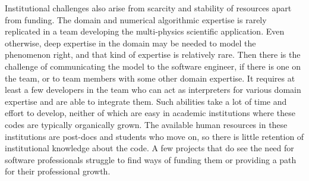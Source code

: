 Institutional challenges also arise from scarcity and stability of
resources apart from funding. The domain and numerical algorithmic
expertise is rarely replicated in a team developing the multi-physics
scientific application.  Even otherwise, deep expertise in the domain may be
needed to model the phenomenon right, and that kind of expertise is
relatively rare. Then there is the challenge of communicating the
model to the software engineer, if there is one on the team, or to
team members with some other domain expertise. It requires at least a
few developers in the team who can act as interpreters for various
domain expertise and are able to integrate them. Such abilities take a
lot of time and effort to develop, neither of which are
easy in academic institutions where these codes are typically
organically grown. The available human resources in these institutions
are post-docs and students who move on, so there is little retention of
institutional knowledge about the code.  A few projects that do see
the need for software professionals struggle to find ways of funding
them or providing a path for their professional growth. 

